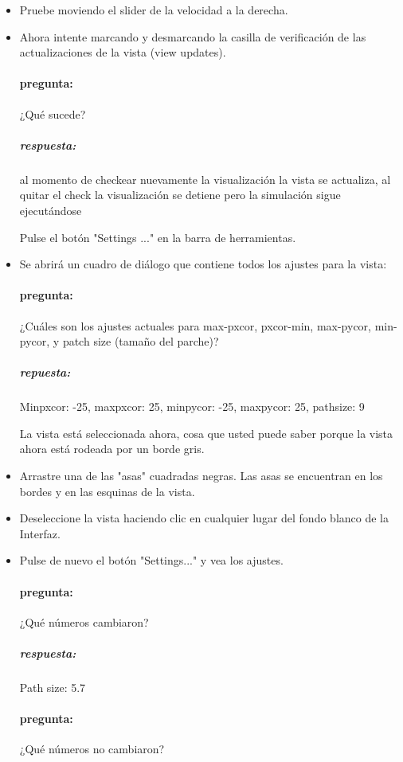 \documentclass[12pt,letterpaper]{article}
\begin{document}
\begin{itemize}
	\item Pruebe moviendo el slider de la velocidad a la derecha.

	\item Ahora intente marcando y desmarcando la casilla de verificación de las actualizaciones de la vista (view updates).

	\paragraph{pregunta:}
		¿Qué sucede?

		\subparagraph{respuesta:} al momento de checkear nuevamente la visualización la vista se actualiza, al quitar el check la visualización se detiene pero la simulación sigue ejecutándose


	Pulse el botón "Settings ..." en la barra de herramientas.

	\item Se abrirá un cuadro de diálogo que contiene todos los ajustes para la vista:
	
	\paragraph{pregunta:}
		¿Cuáles son los ajustes actuales para max-pxcor, pxcor-min, max-pycor, min-pycor, y patch size (tamaño del parche)?
	
	\subparagraph{repuesta:}	
		Minpxcor: -25, maxpxcor: 25, minpycor: -25, maxpycor: 25, pathsize: 9

	La vista está seleccionada ahora, cosa que usted puede saber porque la vista ahora está rodeada por un borde gris.

	\item Arrastre una de las "asas" cuadradas negras. Las asas se encuentran en los bordes y en las esquinas de la vista.
	
	\item Deseleccione la vista haciendo clic en cualquier lugar del fondo blanco de la Interfaz.
	
	\item Pulse de nuevo el botón "Settings..." y vea los ajustes.
	
	\paragraph{pregunta:}
		¿Qué números cambiaron?
		
	\subparagraph{respuesta:}		
		Path size: 5.7
		
	\paragraph{pregunta:}
		¿Qué números no cambiaron?
		

\end{itemize}
\end{document}
